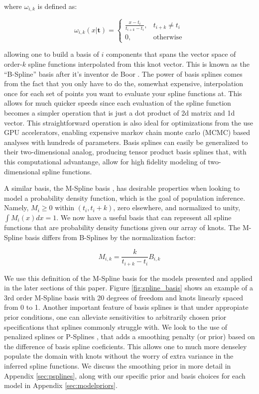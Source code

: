 \noindent where $\omega_{i,k}$ is defined as:

\begin{equation}
\omega_{i,k}(x | \mathbf{t}) =
\begin{cases}
    \frac{x-t_i}{t_{i+k}-t_i}, & t_{i+k} \neq t_i \\
    0, & \text{otherwise}
\end{cases}
\end{equation}

\noindent allowing one to build a basis of $i$ components that spans the vector space of order-$k$ spline functions interpolated 
from this knot vector. This is known as the ``B-Spline'' basis after it's inventor de Boor \cite{deBoor78}. The power of basis splines
comes from the fact that you only have to do the, somewhat expensive, interpolation once for each set of points you want to evaluate your
spline functions at. This allows for much quicker speeds since each evaluation of the spline function becomes a simpler operation that is just
a dot product of 2d matrix and 1d vector. This straightforward operation is also ideal for optimizations from the use GPU accelerators, 
enabling expensive markov chain monte carlo (MCMC) based analyses with hundreds of parameters. Basis splines can easily be generalized to 
their two-dimensional analog, producing tensor product basis splines that, with this computational advantange, allow for high fidelity
modeling of two-dimensional spline functions.

A similar basis, the M-Spline basis \citep{monotone_regression_splines}, has desirable properties when looking to model a probability density function, 
which is the goal of population inference. Namely, $M_i \geq 0$ within $(t_i, t_i+k)$, zero elsewhere, and normalized to unity, $\int M_i(x)dx = 1$. We now have
a useful basis that can represent all spline functions that are probability density functions given our array of knots. The M-Spline basis differs 
from B-Splines by the normalization factor:

\begin{equation}\label{eq:MB_SplineRelation}
M_{i,k} = \frac{k}{t_{i+k} - t_i} B_{i,k}
\end{equation}

\noindent We use this definition of the M-Spline basis for the models presented and applied in the later sections of this paper. 
Figure \ref{fig:spline_basis} shows an example of a 3rd order M-Spline basis with 20 degrees of freedom and knots linearly spaced from 0 to 1.
Another important feature of basis splines is that under appropiate prior conditions, one can alleviate sensitivities to arbitrarily 
chosen prior specifications that splines commonly struggle with. We look to the use of penalized splines or P-Splines \cite{eilers2021practical,BayesianPSplines,Jullion2007RobustSO}, 
that adds a smoothing penalty (or prior) based on the difference of basis spline coeficients. This allows one to much more denseley populate
the domain with knots without the worry of extra variance in the inferred spline functions. We discuss the smoothing prior in more detail 
in Appendix \ref{sec:psplines}, along with our specific prior and basis choices for each model in Appendix \ref{sec:modelpriors}.
